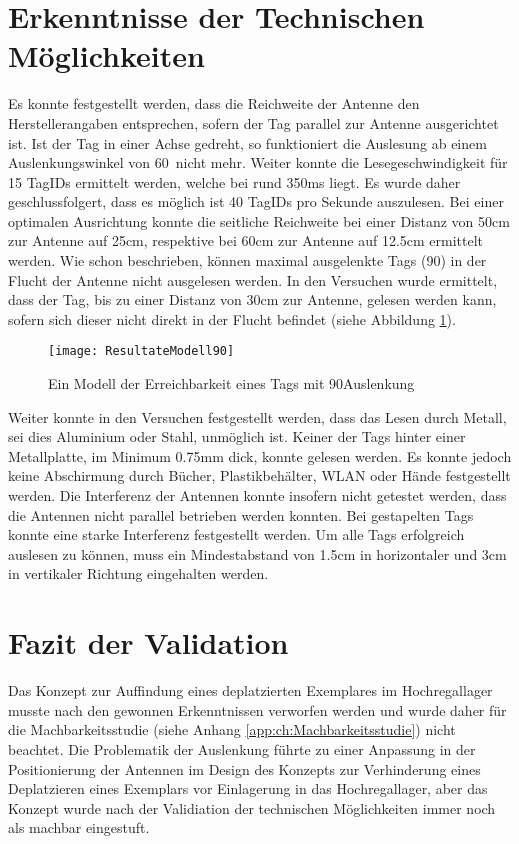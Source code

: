 \section{Erkenntnisse der Technischen Möglichkeiten}
Es konnte festgestellt werden, dass die Reichweite der Antenne den Herstellerangaben entsprechen, sofern der Tag parallel zur Antenne ausgerichtet ist. Ist der Tag in einer Achse gedreht, so funktioniert die Auslesung ab einem Auslenkungswinkel von 60\SIUnitSymbolDegree\ nicht mehr. Weiter konnte die Lesegeschwindigkeit für 15 TagIDs ermittelt werden, welche bei rund 350ms liegt. Es wurde daher geschlussfolgert, dass es möglich ist 40 TagIDs pro Sekunde auszulesen.
Bei einer optimalen Ausrichtung konnte die seitliche Reichweite bei einer Distanz von 50cm zur Antenne auf 25cm, respektive bei 60cm zur Antenne auf 12.5cm ermittelt werden. Wie schon beschrieben, können maximal ausgelenkte Tags (90\SIUnitSymbolDegree) in der Flucht der Antenne nicht ausgelesen werden. In den Versuchen wurde ermittelt, dass der Tag, bis zu einer Distanz von 30cm zur Antenne, gelesen werden kann, sofern sich dieser nicht direkt in der Flucht befindet (siehe Abbildung \ref{fig:Seitlich90}).

\begin{figure}[htb]
	\centering
	\texttt{[image: ResultateModell90]}
	\caption{Ein Modell der Erreichbarkeit eines Tags mit 90\SIUnitSymbolDegree Auslenkung}
	\label{fig:Seitlich90}
\end{figure}

Weiter konnte in den Versuchen festgestellt werden, dass das Lesen durch Metall, sei dies Aluminium oder Stahl, unmöglich ist. Keiner der Tags hinter einer Metallplatte, im Minimum 0.75mm dick, konnte gelesen werden. Es konnte jedoch keine Abschirmung durch Bücher, Plastikbehälter, WLAN oder Hände festgestellt werden. Die Interferenz der Antennen konnte insofern nicht getestet werden, dass die Antennen nicht parallel betrieben werden konnten. Bei gestapelten Tags konnte eine starke Interferenz festgestellt werden. Um alle Tags erfolgreich auslesen zu können, muss ein Mindestabstand von 1.5cm in horizontaler und 3cm in vertikaler Richtung eingehalten werden.

\section{Fazit der Validation}
Das Konzept zur Auffindung eines deplatzierten Exemplares im Hochregallager musste nach den gewonnen Erkenntnissen verworfen werden und wurde daher für die Machbarkeitsstudie (siehe Anhang \ref{app:ch:Machbarkeitsstudie}) nicht beachtet. Die Problematik der Auslenkung führte zu einer Anpassung in der Positionierung der Antennen im Design des Konzepts zur Verhinderung eines Deplatzieren eines Exemplars vor Einlagerung in das Hochregallager, aber das Konzept wurde nach der Validiation der technischen Möglichkeiten immer noch als machbar eingestuft.